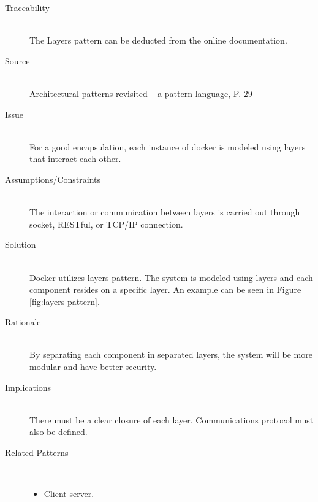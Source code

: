 \begin{description}
\item [Traceability]~\\
The Layers pattern can be deducted from the online documentation\cite{dockerarchi}.

\item [Source]~\\
Architectural patterns revisited -- a pattern language, P. 29 \cite{avgeriou2005architectural}

\item [Issue]~\\
For a good encapsulation, each instance of docker is modeled using layers that interact each other.

\item [Assumptions/Constraints]~\\
The interaction or communication between layers is carried out through socket, RESTful, or TCP/IP connection.

\item [Solution]~\\
Docker utilizes layers pattern. The system is modeled using layers and each component resides on a specific layer. An example can be seen in Figure \ref{fig:layers-pattern}.

\item [Rationale] ~\\
By separating each component in separated layers, the system will be more modular and have better security.

\item [Implications]~\\
There must be a clear closure of each layer. Communications protocol must also be defined.

\item [Related Patterns]~\\
\begin{itemize}
	\item Client-server.
\end{itemize}
\end{description}

\clearpage

